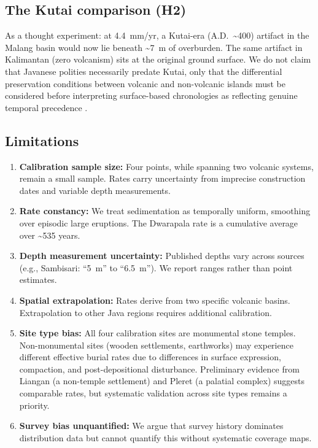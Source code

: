 \documentclass[12pt,letterpaper]{article}
\begin{document}
\subsection{The Kutai comparison (H2)}

As a thought experiment: at 4.4~mm/yr, a Kutai-era (A.D.~\textasciitilde 400) artifact in the Malang basin would now lie beneath \textasciitilde7~m of overburden. The same artifact in Kalimantan (zero volcanism) sits at the original ground surface. We do not claim that Javanese polities necessarily predate Kutai, only that the differential preservation conditions between volcanic and non-volcanic islands must be considered before interpreting surface-based chronologies as reflecting genuine temporal precedence \citep{coedes1968}.

\subsection{Limitations}

\begin{enumerate}
  \item \textbf{Calibration sample size:} Four points, while spanning two volcanic systems, remain a small sample. Rates carry uncertainty from imprecise construction dates and variable depth measurements.
  \item \textbf{Rate constancy:} We treat sedimentation as temporally uniform, smoothing over episodic large eruptions. The Dwarapala rate is a cumulative average over \textasciitilde535 years.
  \item \textbf{Depth measurement uncertainty:} Published depths vary across sources (e.g., Sambisari: ``5~m'' to ``6.5~m''). We report ranges rather than point estimates.
  \item \textbf{Spatial extrapolation:} Rates derive from two specific volcanic basins. Extrapolation to other Java regions requires additional calibration.
  \item \textbf{Site type bias:} All four calibration sites are monumental stone temples. Non-monumental sites (wooden settlements, earthworks) may experience different effective burial rates due to differences in surface expression, compaction, and post-depositional disturbance. Preliminary evidence from Liangan (a non-temple settlement) and Pleret (a palatial complex) suggests comparable rates, but systematic validation across site types remains a priority.
  \item \textbf{Survey bias unquantified:} We argue that survey history dominates distribution data but cannot quantify this without systematic coverage maps.
\end{enumerate}
\end{document}
